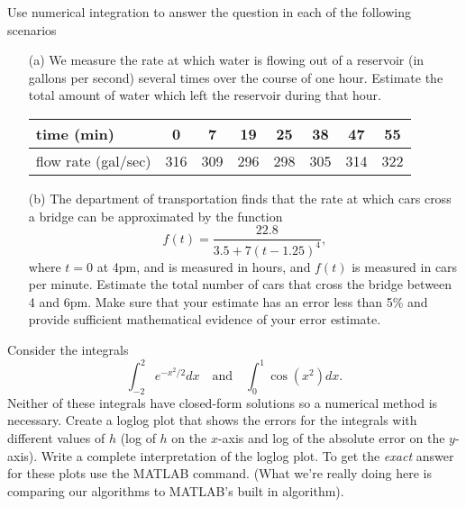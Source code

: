 \begin{problem}
    Use numerical integration to answer the question in each of the following scenarios
    \begin{enumerate}
        \item[(a)] We measure the rate at which water is flowing out of a reservoir (in
            gallons per second) several times over the course of one hour.  Estimate the
            total amount of water which left the reservoir during that hour.
            \begin{center}
                \begin{tabular}{|l||c|c|c|c|c|c|c|}
                    \hline
                    time (min) & 0 & 7 & 19 & 25 & 38 & 47 & 55 \\ \hline
                    flow rate (gal/sec) & 316 & 309 & 296 & 298 & 305 & 314 & 322 \\ \hline
                \end{tabular}
            \end{center}
        \item[(b)] The department of transportation finds that the rate at which cars
            cross a bridge can be approximated by the function
            \[ f(t) = \frac{22.8 }{3.5 + 7(t-1.25)^4} , \]
            where $t=0$ at 4pm, and is measured in hours, and $f(t)$ is measured in cars
            per minute.  Estimate the total number of
            cars that cross the bridge between 4 and 6pm.  Make sure that your estimate has
            an error less than 5\% and provide sufficient mathematical evidence of your
            error estimate.
    \end{enumerate}
\end{problem}


\begin{problem}
    Consider the integrals 
    \[ \int_{-2}^2 e^{-x^2/2} dx \quad \text{and} \quad \int_0^1 \cos(x^2) dx. \]
    Neither of these integrals have closed-form solutions so a numerical method is
    necessary.  Create a loglog plot that shows the errors for the integrals with different values of $h$ (log
    of $h$ on the $x$-axis and log of the absolute error on the $y$-axis).
    Write a complete interpretation of the loglog plot.  
    To get the {\it exact} answer for these plots use the MATLAB  command.
    (What we're really doing here is comparing our algorithms to MATLAB's built in algorithm).
\end{problem}


